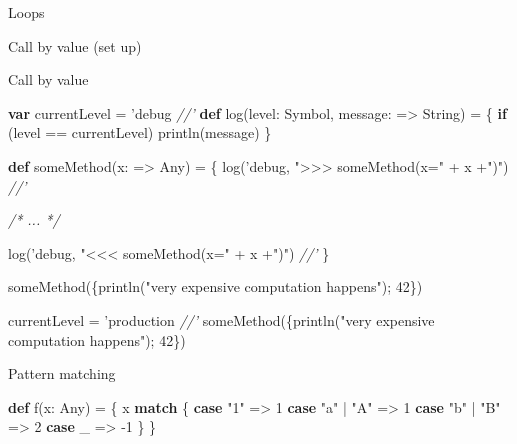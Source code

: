 \documentclass[ignorenonframetext,]{beamer}
\newenvironment{Shaded}{\begin{snugshade}}{\end{snugshade}}
\newcommand{\KeywordTok}[1]{\textcolor[rgb]{0.13,0.29,0.53}{\textbf{#1}}}
\newcommand{\DecValTok}[1]{\textcolor[rgb]{0.00,0.00,0.81}{#1}}
\newcommand{\StringTok}[1]{\textcolor[rgb]{0.31,0.60,0.02}{#1}}
\newcommand{\CommentTok}[1]{\textcolor[rgb]{0.56,0.35,0.01}{\textit{#1}}}
\newcommand{\FunctionTok}[1]{\textcolor[rgb]{0.00,0.00,0.00}{#1}}
\newcommand{\NormalTok}[1]{#1}
\begin{document}
\begin{frame}[fragile]{Loops}
\begin{block}{Call by value (set up)}
\end{block}

\begin{block}{Call by value}

\begin{Shaded}
\begin{Highlighting}[]
\KeywordTok{var}\NormalTok{ currentLevel = 'debug                                                         }\CommentTok{//'}
\KeywordTok{def} \FunctionTok{log}\NormalTok{(level: Symbol, message: => String) = \{}
  \KeywordTok{if}\NormalTok{ (level == currentLevel)}
    \FunctionTok{println}\NormalTok{(message)}
\NormalTok{\}}

\KeywordTok{def} \FunctionTok{someMethod}\NormalTok{(x: => Any) = \{}
  \FunctionTok{log}\NormalTok{('debug, }\StringTok{">>> someMethod(x="}\NormalTok{ + x +}\StringTok{")"}\NormalTok{)                                                         }\CommentTok{//'}
  
  \CommentTok{/* ... */}
  
  \FunctionTok{log}\NormalTok{('debug, }\StringTok{"<<< someMethod(x="}\NormalTok{ + x +}\StringTok{")"}\NormalTok{)                                                         }\CommentTok{//'}
\NormalTok{\}}

\FunctionTok{someMethod}\NormalTok{(\{}\FunctionTok{println}\NormalTok{(}\StringTok{"very expensive computation happens"}\NormalTok{); }\DecValTok{42}\NormalTok{\})}

\NormalTok{currentLevel = 'production                                                         }\CommentTok{//'}
\FunctionTok{someMethod}\NormalTok{(\{}\FunctionTok{println}\NormalTok{(}\StringTok{"very expensive computation happens"}\NormalTok{); }\DecValTok{42}\NormalTok{\})}
\end{Highlighting}
\end{Shaded}

\end{block}

\begin{block}{Pattern matching}

\begin{Shaded}
\begin{Highlighting}[]
\KeywordTok{def} \FunctionTok{f}\NormalTok{(x: Any) = \{}
\NormalTok{    x }\KeywordTok{match}\NormalTok{ \{}
        \KeywordTok{case} \StringTok{"1"}\NormalTok{ => }\DecValTok{1}
        \KeywordTok{case} \StringTok{"a"}\NormalTok{ | }\StringTok{"A"}\NormalTok{ => }\DecValTok{1}
        \KeywordTok{case} \StringTok{"b"}\NormalTok{ | }\StringTok{"B"}\NormalTok{ => }\DecValTok{2}
        \KeywordTok{case}\NormalTok{ _ => }\DecValTok{-1}
\NormalTok{    \}}
\NormalTok{\}}
\end{Highlighting}
\end{Shaded}


\end{block}
\end{frame}
\end{document}
